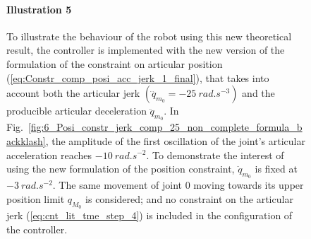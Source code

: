 \begin{figure}[!htbp]
\paragraph{Illustration 5}
To illustrate the behaviour of the robot using this new theoretical result, the controller is implemented with the new version of the formulation of the constraint on articular position (\ref{eq:Constr_comp_posi_acc_jerk_1_final}), that takes into account both the articular jerk $(\dddot{q}_{m_{0}} = -25~rad.s^{-3})$ and the producible articular deceleration $\ddot{q}_{m_{0}}$. In Fig.~\ref{fig:6_Posi_constr_jerk_comp_25_non_complete_formula_backklash}, the amplitude of  the first oscillation of the joint's articular acceleration reaches $-10~rad.s^{-2}$. To demonstrate the interest of using the new formulation of the position constraint, $\ddot{q}_{m_{0}}$ is fixed at $-3~rad.s^{-2}$. The same movement of joint $0$ moving towards its upper position limit $q_{M_{0}}$ is considered; and no constraint on the articular jerk (\ref{eq:cnt_lit_tme_step_4}) is included in the configuration of the controller.  


\end{figure}
